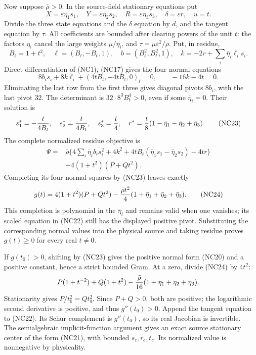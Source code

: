 Now suppose $\bar\rho>0$. In the source-field stationary equations
put
\[
 X=\varepsilon\eta_1s_1,\quad
 Y=\varepsilon\eta_2s_2,\quad
 R=\varepsilon\eta_3s_3,\quad\delta=\varepsilon r,
 \quad u=t.                                          \tag{NC21}
\]
Divide the three state equations and the $\delta$ equation by $d$,
and the tangent equation by $\tau$. All coefficients are bounded
after clearing powers of the unit $t$: the factors $\eta_i$ cancel
the large weights $\mu/\eta_i$, and
$\tau=\mu\varepsilon^2/\rho$. Put, in residue,
\[
 B_t=1+t^2,\quad\ell=(B_t,-B_t,1),\quad
 b=(B_t^2,B_t^2,1),\quad
 k=-2r+\sum_i\bar\eta_i\ell_i s_i.
\]
Direct differentiation of (NC1), (NC17) gives the four normal equations
\[
 8b_i s_i+8k\ell_i+(4tB_t,-4tB_t,0)_i=0,
 \qquad-16k-4t=0.                                   \tag{NC22}
\]
Eliminating the last row from the first three gives diagonal pivots
$8b_i$, with the last pivot $32$. The determinant is
$32\cdot8^3B_t^4>0$, even if some $\bar\eta_i=0$.
Their solution is
\[
 s_1^*=-{t\over4B_t},\quad s_2^*={t\over4B_t},\quad
 s_3^*={t\over4},\quad
 r^*={t\over8}(1-\bar\eta_1-\bar\eta_2+\bar\eta_3).
 \tag{NC23}
\]
The complete normalized residue objective is
\[
\begin{split}
 \Psi={}&\bar\rho\{4\sum_i\bar\eta_i b_i s_i^2+4k^2
           +4tB_t(\bar\eta_1s_1-\bar\eta_2s_2)-4tr\}\\
 &+4(1+t^2)(P+Qt^2).
\end{split}
\]
Completing its four normal squares by (NC23) leaves exactly
\[
 g(t)=4(1+t^2)(P+Qt^2)
       -{\bar\rho t^2\over4}
          (1+\bar\eta_1+\bar\eta_2+\bar\eta_3).     \tag{NC24}
\]
This completion is polynomial in the $\bar\eta_i$ and remains
valid when one vanishes; its scaled equation in (NC22) still has
the displayed positive pivot. Substituting the corresponding normal
values into the physical source and taking residue proves $g(t)\ge0$
for every real $t\ne0$.

If $g(t_0)>0$, shifting by (NC23) gives the positive normal form
(NC20) and a positive constant, hence a strict bounded Gram. At a
zero, divide (NC24) by $4t^2$:
\[
 P(1+t^{-2})+Q(1+t^2)
       -{\bar\rho\over16}(1+\bar\eta_1+\bar\eta_2+\bar\eta_3).
\]
Stationarity gives $P/t_0^2=Qt_0^2$. Since $P+Q>0$, both are
positive; the logarithmic second derivative is positive, and thus
$g''(t_0)>0$. Append the tangent equation to (NC22). Its Schur
complement is $g''(t_0)$, so its real Jacobian is invertible. The
semialgebraic implicit-function argument gives an exact source
stationary center of the form (NC21), with bounded $s_c,r_c,t_c$.
Its normalized value is nonnegative by physicality.

